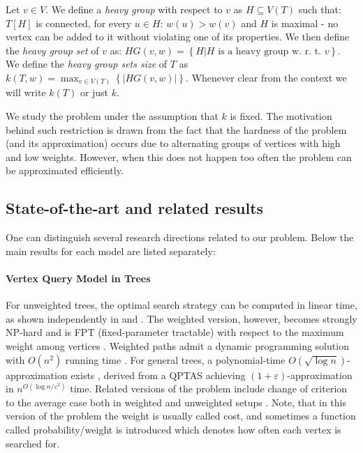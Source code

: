 \documentclass[a4paper, anonymous, numberwithinsect, pdfa, UKenglish,cleveref, autoref, thm-restate]{socg-lipics-v2021}
\newcommand{\br}[1]{\left( #1 \right)}
\newcommand{\brc}[1]{\left\{ #1 \right\}}
\newcommand{\spr}[1]{\left| #1 \right|}
\begin{document}
Let $v\in V$. We define a \textit{heavy group} with respect to $v$ as $H\subseteq V\br{T}$ such that: $T[H]$ is connected, for every $u \in H$: $w\br{u}>w\br{v}$ and $H$ is maximal - no vertex can be added to it without violating one of its properties. We then define the \textit{heavy group set} of $v$ as: $HG\br{v,w}=\brc{H|H \text{ is a heavy group w. r. t. } v}$. We define the \textit{heavy group sets size} of $T$ as $k\br{T, w}=\max_{v\in V\br{T}}\brc{\spr{HG\br{v,w}}}$. Whenever clear from the context we will write $k\br{T}$ or just $k$.

We study the problem under the assumption that $k$ is fixed.
The motivation behind such restriction is drawn from the fact that the hardness of the problem (and its approximation) occurs due to alternating groups of vertices with high and low weights. However, when this does not happen too often the problem can be approximated efficiently.
\subsection{State-of-the-art and related results}
One can distinguish several research directions related to our problem. Below the main results for each model are listed separately:

\paragraph*{Vertex Query Model in Trees}
For unweighted trees, the optimal search strategy can be computed in linear time, as shown independently in \cite{OnakParys2006GenOfBSSInTsAndFLikePosets} and \cite{Schaffer1989OptNodeRankOfTsInLinTime}. The weighted version, however, becomes strongly NP-hard and is FPT (fixed-parameter tractable) with respect to the maximum weight among vertices \cite{DereniowskiVxRankOfChGsAndWTs}. Weighted paths admit a dynamic programming solution with $O(n^2)$ running time \cite{Cicalese2012BinIdentPForWTs, LaberOnBSWithNonUniCosts}. For general trees, a polynomial-time $O(\sqrt{\log n})$-approximation exists \cite{dereniowski2017ApproxSsForGeneralBSinWTs}, derived from a QPTAS achieving $(1+\varepsilon)$-approximation in $n^{O(\log n / \varepsilon^2)}$ time. Related versions of the problem include change of criterion to the average case both in weighted \cite{Cicalese2016DecTreesSimEval, Dasgupta} and unweighted setups \cite{SplayTonT, Fast_app_centroid_trees}. Note, that in this version of the problem the weight is usually called cost, and sometimes a function called probability/weight is introduced which denotes how often each vertex is searched for.
\end{document}

